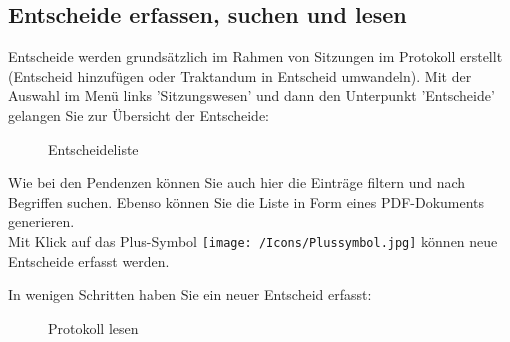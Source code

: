 
\subsection{Entscheide erfassen, suchen und lesen}

Entscheide werden grundsätzlich im Rahmen von Sitzungen im Protokoll erstellt (Entscheid hinzufügen oder Traktandum in Entscheid umwandeln). 
Mit der Auswahl im Menü links 'Sitzungswesen' und dann den Unterpunkt 'Entscheide' gelangen Sie zur Übersicht der Entscheide:

\begin{figure}[H]
\caption{Entscheideliste}
\end{figure}

Wie bei den Pendenzen können Sie auch hier die Einträge filtern und nach Begriffen suchen. Ebenso können Sie die Liste in Form eines PDF-Dokuments generieren. \\

Mit Klick auf das Plus-Symbol \texttt{[image: /Icons/Plussymbol.jpg]} können neue Entscheide erfasst werden.

\clearpage
In wenigen Schritten haben Sie ein neuer Entscheid erfasst:

\begin{figure}[H]
\caption{Protokoll lesen}
\end{figure}

